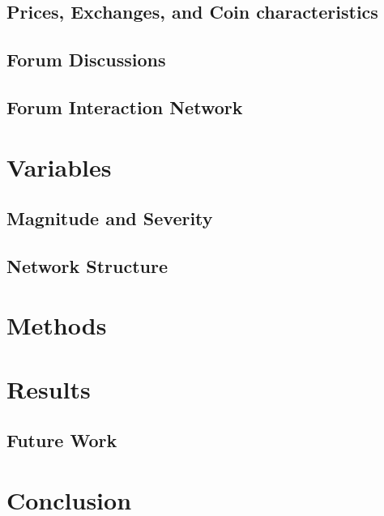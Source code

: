 \documentclass{acm_proc_article_sp}%
\begin{document}
\subsection{Prices, Exchanges, and Coin characteristics} \label{data_nikete}



\subsection{Forum Discussions}


\subsection{Forum Interaction Network}



\section{Variables}
\subsection{Magnitude and Severity} \label{variables_nikete}


\subsection{Network Structure}


\section{Methods }


\section{Results}




\subsection{Future Work}


\section{Conclusion}

\end{document}
